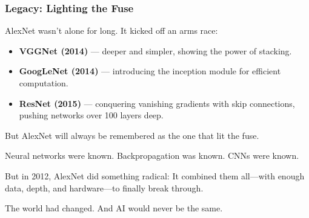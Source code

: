\subsubsection{Legacy: Lighting the Fuse}

AlexNet wasn’t alone for long. It kicked off an arms race:
\begin{itemize}
  \item \textbf{VGGNet (2014)} — deeper and simpler, showing the power of stacking.
  \item \textbf{GoogLeNet (2014)} — introducing the inception module for efficient computation.
  \item \textbf{ResNet (2015)} — conquering vanishing gradients with skip connections, pushing networks over 100 layers deep.
\end{itemize}

But AlexNet will always be remembered as the one that lit the fuse.

\begin{tcolorbox}[colback=blue!5!white, colframe=blue!50!black, title={AlexNet: From Curiosity to Conquest}]
Neural networks were known.  
Backpropagation was known.  
CNNs were known.  

But in 2012, AlexNet did something radical:  
It combined them all—with enough data, depth, and hardware—to finally break through.  

The world had changed.  
And AI would never be the same.
\end{tcolorbox}
